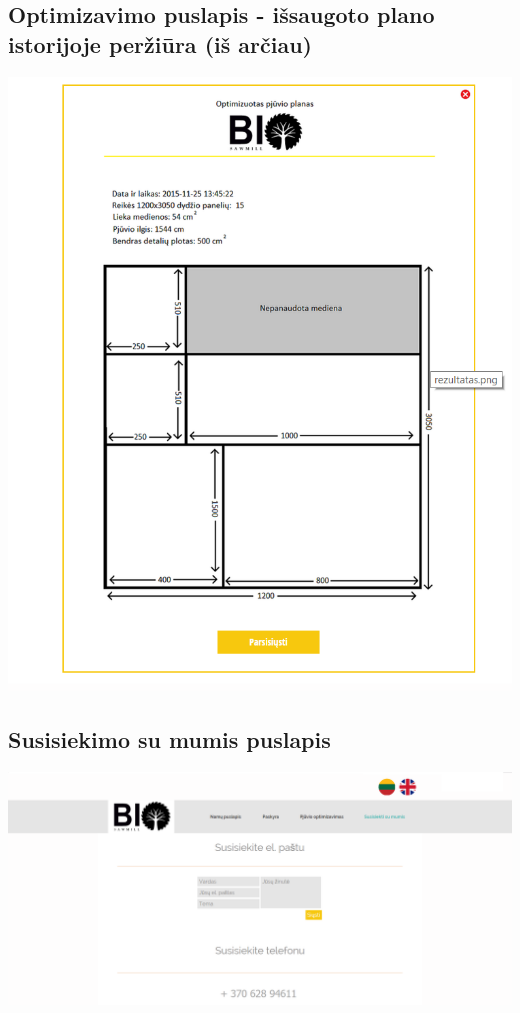 \documentclass[a4paper,12pt]{article}
\begin{document}
\subsection{Optimizavimo puslapis - išsaugoto plano istorijoje peržiūra (iš arčiau)}
\hspace{-2cm}
\includegraphics[scale=1.2]{interfeisai/optimizavimoPuslapisPrisijungusIsaugotasPlanas}

\subsection{Susisiekimo su mumis puslapis}
\hspace{-2cm}
\includegraphics[scale=0.5]{interfeisai/susisiekimas}
\end{document}
